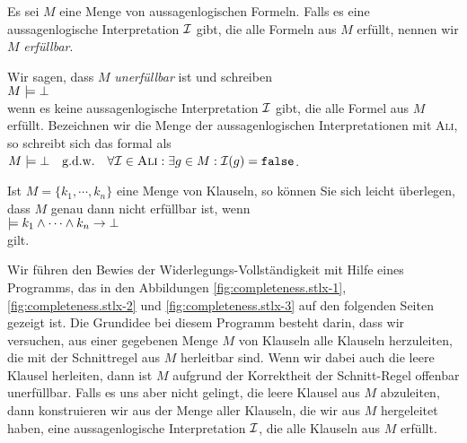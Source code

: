 \begin{Definition}
  Es sei $M$ eine Menge von aussagenlogischen Formeln.
  Falls es eine aussagenlogische Interpretation $\mathcal{I}$ gibt, die alle Formeln aus $M$ erf\"{u}llt, nennen
  wir $M$ \emph{\color{blue}erf\"{u}llbar}. 

  Wir sagen, dass $M$ \emph{\color{blue}unerf\"{u}llbar} ist und schreiben 
  \\[0.2cm]
  \hspace*{1.3cm}
  $M \models \bot$
  \\[0.2cm]
  wenn es keine aussagenlogische Interpretation $\mathcal{I}$ gibt, die alle Formel aus $M$ erf\"{u}llt.
  Bezeichnen wir die Menge der aussagenlogischen Interpretationen mit
  \textsc{Ali}, so schreibt sich das formal als
  \\[0.2cm]
  \hspace*{1.3cm}
  $M \models \bot \quad \mbox{g.d.w.} \quad \forall \mathcal{I} \in \textsc{Ali}: \exists g \in M: \mathcal{I}(g) = \texttt{false}$.   
  \eox
\end{Definition}

\remark 
Ist $M = \{ k_1, \cdots, k_n \}$ eine Menge von Klauseln, so k\"{o}nnen Sie sich leicht \"{u}berlegen, dass
$M$ genau dann nicht erf\"{u}llbar ist, wenn
\\[0.2cm]
\hspace*{1.3cm}
$\models k_1 \wedge \cdots \wedge k_n \rightarrow \bot$
\\[0.2cm]
gilt. \eox

Wir f\"{u}hren den Bewies der Widerlegungs-Vollst\"{a}ndigkeit mit Hilfe eines Programms, das in den
Abbildungen \ref{fig:completeness.stlx-1}, \ref{fig:completeness.stlx-2} und
\ref{fig:completeness.stlx-3} auf den folgenden Seiten gezeigt ist.  Die Grundidee
bei diesem Programm besteht darin, dass wir versuchen, aus einer gegebenen Menge $M$ von Klauseln
alle Klauseln herzuleiten, die mit der Schnittregel aus $M$ herleitbar sind.  Wenn wir dabei auch
die leere Klausel herleiten, dann ist $M$ aufgrund der Korrektheit der Schnitt-Regel offenbar
unerf\"{u}llbar.  Falls es uns aber nicht gelingt, die leere Klausel aus $M$ abzuleiten, dann konstruieren wir
aus der Menge aller Klauseln, die wir aus $M$ hergeleitet haben, eine aussagenlogische Interpretation
$\mathcal{I}$, die alle Klauseln aus $M$ erf\"{u}llt.

